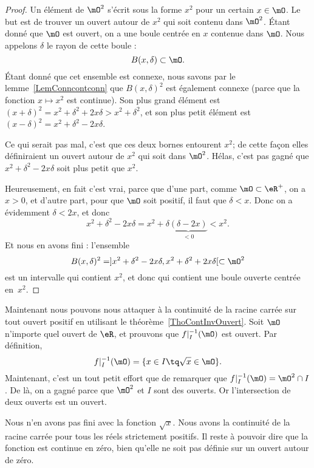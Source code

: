 \begin{proof}
	Un élément de \( \mO^2\) s'écrit sous la forme \( x^2\) pour un certain \( x\in\mO\). Le but est de trouver un ouvert autour de \( x^2\) qui soit contenu dans \( \mO^2\). Étant donné que \( \mO\) est ouvert, on a une boule centrée en \( x\) contenue dans \( \mO\). Nous appelons \( \delta\) le rayon de cette boule :
	\[
		B(x,\delta)\subset\mO.
	\]
	Étant donné que cet ensemble est connexe, nous savons par le lemme~\ref{LemConncontconn} que \( B(x,\delta)^2\) est également connexe (parce que la fonction \( x\mapsto x^2\) est continue). Son plus grand élément est \( (x+\delta)^2=x^2+\delta^2+2x\delta>x^2+\delta^2\), et son plus petit élément est \( (x-\delta)^2=x^2+\delta^2-2x\delta\).

	Ce qui serait pas mal, c'est que ces deux bornes entourent \( x^2\); de cette façon elles définiraient un ouvert autour de \( x^2\) qui soit dans \( \mO^2\). Hélas, c'est pas gagné que \( x^2+\delta^2-2x\delta\) soit plus petit que \( x^2\).

	Heureusement, en fait c'est vrai, parce que d'une part, comme \( \mO\subset\eR^+\), on a \( x>0\), et d'autre part, pour que \( \mO\) soit positif, il faut que \( \delta<x\). Donc on a évidemment \( \delta<2x\), et donc
	\[
		x^2+\delta^2-2x\delta=x^2+\delta\underbrace{(\delta-2x)}_{<0}<x^2.
	\]
	Et nous en avons fini : l'ensemble
	\[
		B(x,\delta)^2=]x^2+\delta^2-2x\delta,x^2+\delta^2+2x\delta[\subset\mO^2
	\]
	est un intervalle qui contient \( x^2\), et donc qui contient une boule ouverte centrée en~\( x^2\).
\end{proof}

Maintenant nous pouvons nous attaquer à la continuité de la racine carrée sur tout ouvert positif en utilisant le théorème~\ref{ThoContInvOuvert}. Soit \( \mO\) n'importe quel ouvert de \( \eR\), et prouvons que \( f|_I^{-1}(\mO)\) est ouvert. Par définition,
\begin{equation}
	f|_I^{-1}(\mO)=\{ x\in I\tq \sqrt{x}\in\mO \}.
\end{equation}
Maintenant, c'est un tout petit effort que de remarquer que \( f|_I^{-1}(\mO)=\mO^2\cap I\). De là, on a gagné parce que \( \mO^2\) et \( I\) sont des ouverts. Or l'intersection de deux ouverts est un ouvert.

Nous n'en avons pas fini avec la fonction \( \sqrt{x}\). Nous avons la continuité de la racine carrée pour tous les réels strictement positifs. Il reste à pouvoir dire que la fonction est continue en zéro, bien qu'elle ne soit pas définie sur un ouvert autour de zéro.

